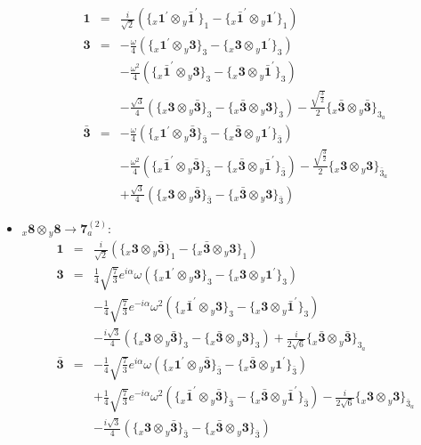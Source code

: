 \documentclass[english]{article}
\newcommand{\rep}[1]{\mathbf{#1}}
\newcommand{\repx}[2]{{}_{#2}\mathbf{#1}}
\newcommand{\subcg}[3]{\big\{ \repx{#1}{x}\otimes\repx{#2}{y}\big\}^{}_{#3}}
\begin{document}
\begin{itemize}
\begin{eqnarray*}
\rep{1} &=& \frac{i}{\sqrt{2}}\left(\subcg{1^{\prime}}{\bar{1}^{\prime}}{1}-\subcg{\bar{1}^{\prime}}{1^{\prime}}{1}\right)
\\
\rep{3} &=& -\frac{\omega }{4}\left(\subcg{1^{\prime}}{3}{3}-\subcg{3}{1^{\prime}}{3}\right) \\ 
 & & -\frac{\omega ^2}{4}\left(\subcg{\bar{1}^{\prime}}{3}{3}-\subcg{3}{\bar{1}^{\prime}}{3}\right) \\ 
 & & -\frac{\sqrt{3}}{4}\left(\subcg{3}{\bar{3}}{3}-\subcg{\bar{3}}{3}{3}\right)-\frac{\sqrt{\frac{3}{2}}}{2}\subcg{\bar{3}}{\bar{3}}{3_{a}}
\\
\rep{\bar{3}} &=& -\frac{\omega }{4}\left(\subcg{1^{\prime}}{\bar{3}}{\bar{3}}-\subcg{\bar{3}}{1^{\prime}}{\bar{3}}\right) \\ 
 & & -\frac{\omega ^2}{4}\left(\subcg{\bar{1}^{\prime}}{\bar{3}}{\bar{3}}-\subcg{\bar{3}}{\bar{1}^{\prime}}{\bar{3}}\right)-\frac{\sqrt{\frac{3}{2}}}{2}\subcg{3}{3}{\bar{3}_{a}} \\ 
 & & +\frac{\sqrt{3}}{4}\left(\subcg{3}{\bar{3}}{\bar{3}}-\subcg{\bar{3}}{3}{\bar{3}}\right)
\end{eqnarray*}
\item $\repx{8}{x}\otimes\repx{8}{y}\to\rep{7}_{a}^{(2)}$:
\begin{eqnarray*}
\rep{1} &=& \frac{i}{\sqrt{2}}\left(\subcg{3}{\bar{3}}{1}-\subcg{\bar{3}}{3}{1}\right)
\\
\rep{3} &=& \frac{1}{4} \sqrt{\frac{7}{3}} e^{i \alpha } \omega\left(\subcg{1^{\prime}}{3}{3}-\subcg{3}{1^{\prime}}{3}\right) \\ 
 & & -\frac{1}{4} \sqrt{\frac{7}{3}} e^{-i \alpha } \omega ^2\left(\subcg{\bar{1}^{\prime}}{3}{3}-\subcg{3}{\bar{1}^{\prime}}{3}\right) \\ 
 & & -\frac{i \sqrt{3}}{4}\left(\subcg{3}{\bar{3}}{3}-\subcg{\bar{3}}{3}{3}\right)+\frac{i}{2 \sqrt{6}}\subcg{\bar{3}}{\bar{3}}{3_{a}}
\\
\rep{\bar{3}} &=& -\frac{1}{4} \sqrt{\frac{7}{3}} e^{i \alpha } \omega\left(\subcg{1^{\prime}}{\bar{3}}{\bar{3}}-\subcg{\bar{3}}{1^{\prime}}{\bar{3}}\right) \\ 
 & & +\frac{1}{4} \sqrt{\frac{7}{3}} e^{-i \alpha } \omega ^2\left(\subcg{\bar{1}^{\prime}}{\bar{3}}{\bar{3}}-\subcg{\bar{3}}{\bar{1}^{\prime}}{\bar{3}}\right)-\frac{i}{2 \sqrt{6}}\subcg{3}{3}{\bar{3}_{a}} \\ 
 & & -\frac{i \sqrt{3}}{4}\left(\subcg{3}{\bar{3}}{\bar{3}}-\subcg{\bar{3}}{3}{\bar{3}}\right)
\end{eqnarray*}

\end{itemize}
\end{document}
